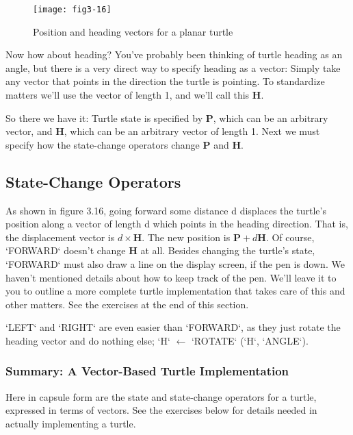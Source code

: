 \documentclass{book}
\begin{document}
\begin{figure}
\begin{center}
\texttt{[image: fig3-16]}
\caption{Position and heading vectors for a planar turtle}
\end{center}
\end{figure}

Now how about heading? You've probably been thinking of turtle
heading as an angle, but there is a very direct way to specify heading as
a vector: Simply take any vector that points in the direction the turtle
is pointing. To standardize matters we'll use the vector of length 1, and
we'll call this \textbf{H}.

So there we have it: Turtle state is specified by \textbf{P}, which can be an
arbitrary vector, and \textbf{H}, which can be an arbitrary vector of length 1.
Next we must specify how the state-change operators change \textbf{P} and \textbf{H}.

\subsection{State-Change Operators}

As shown in figure 3.16, going forward some distance d displaces the
turtle's position along a vector of length d which points in the heading
direction. That is, the displacement vector is $d \times \mathbf{H}$. The new position is
$\mathbf{P} + d\mathbf{H}$. Of course, \textsc{`FORWARD`} doesn't change \textbf{H} at all. Besides changing
the turtle's state, \textsc{`FORWARD`} must also draw a line on the display screen,
if the pen is down. We haven't mentioned details about how to keep
track of the pen. We'll leave it to you to outline a more complete
turtle implementation that takes care of this and other matters. See
the exercises at the end of this section.

\textsc{`LEFT`} and \textsc{`RIGHT`} are even easier than \textsc{`FORWARD`}, as they just rotate the
heading vector and do nothing else; \textsc{`H`} $\leftarrow$ \textsc{`ROTATE`} (\textsc{`H`}, \textsc{`ANGLE`}).

\subsubsection{Summary: A Vector-Based Turtle Implementation}

Here in capsule form are the state and state-change operators for a turtle,
expressed in terms of vectors. See the exercises below for details needed
in actually implementing a turtle.
\end{document}
